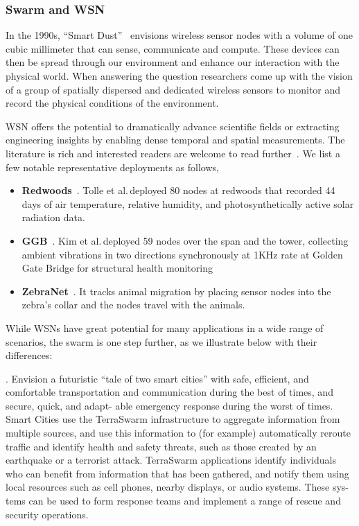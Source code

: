 \subsubsection{Swarm and WSN}
\label{sec:swarm-wsn}

In the 1990s, ``Smart Dust''~\cite{kahn1999next} envisions wireless sensor nodes
with a volume of one cubic millimeter that can sense, communicate and
compute. These devices can then be spread through our environment and enhance
our interaction with the physical world. When answering the question
researchers come up with the vision of a group of spatially dispersed and
dedicated wireless sensors to monitor and record the physical conditions of the
environment.

WSN offers the potential to dramatically advance scientific fields or extracting
engineering insights by enabling dense temporal and spatial measurements. The
literature is rich and interested readers are welcome to read
further~\cite{akyildiz2002wireless, zhao2009wireless}. We list a few notable
representative deployments as follows,

\begin{itemize}[itemsep=5pt]
\item \textbf{Redwoods}~\cite{tolle2005macroscope}. Tolle et al.\,deployed 80
  nodes at redwoods that recorded 44 days of air temperature, relative humidity,
  and photosynthetically active solar radiation data.
\item \textbf{GGB}~\cite{kim2007health}. Kim et al.\,deployed 59 nodes over the
  span and the tower, collecting ambient vibrations in two directions
  synchronously at 1KHz rate at Golden Gate Bridge for structural health
  monitoring
\item \textbf{ZebraNet}~\cite{zhang2005habitat}. It tracks animal migration by
  placing sensor nodes into the zebra's collar and the nodes travel with the
  animals.
\end{itemize}

While WSNs have great potential for many applications in a wide range of
scenarios, the swarm is one step further, as we illustrate below with their
differences:

.
Envision a futuristic “tale of two smart cities” with safe, efficient, and
comfortable transportation and communication during the best of times, and
secure, quick, and adapt- able emergency response during the worst of
times. Smart Cities use the TerraSwarm infrastructure to aggregate information
from multiple sources, and use this information to (for example) automatically
reroute traffic and identify health and safety threats, such as those created by
an earthquake or a terrorist attack. TerraSwarm applications identify
individuals who can benefit from information that has been gathered, and notify
them using local resources such as cell phones, nearby displays, or audio
systems. These sys- tems can be used to form response teams and implement a
range of rescue and security operations.

